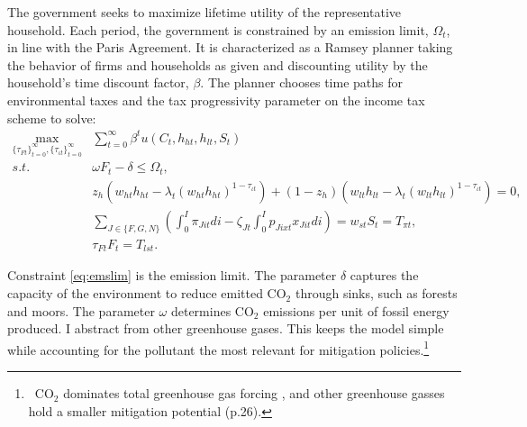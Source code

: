 The government seeks to maximize lifetime utility of the representative household. Each period, the government is constrained by an emission limit, $\Omega_t$, in line with the Paris Agreement.  
It is characterized as a Ramsey planner taking the behavior of firms and households as given and discounting utility by the household's time discount factor, $\beta$.
The planner chooses time paths for environmental taxes and the tax progressivity parameter on the income tax scheme to solve:%
\begin{align}
\underset{\{\tau_{Ft}\}_{t=0}^{\infty},\{\tau_{\iota t}\}_{t=0}^{\infty}}{\max}&\sum_{t=0}^{\infty}\beta^t u(C_{t}, h_{ht}, h_{lt}, S_t)%
\nonumber \\
s.t.\ %
&  \omega F_{t} -\delta \leq \Omega_t, \label{eq:emslim} %
\\ %
&  z_h\left(w_{ht}h_{ht}-\lambda_t \left(w_{ht}h_{ht}\right)^{1-\tau_{\iota t}}\right)+(1-z_h)\left(w_{lt}h_{lt}-\lambda_t\left(w_{lt}h_{lt}\right)^{1-\tau_{\iota t}}\right)=0, \label{eq:incbud}\\
&  \sum_{J\in\{F,G,N\}}\left(\int_{0}^{I}\pi_{Jit}di-\zeta_{Jt}\int_{0}^{I}p_{Jixt}x_{Jit}di\right) = w_{st}S_t= T_{\pi t},\label{eq:profbud}\\ 
&  \tau_{Ft}F_{t}=T_{lst}.\label{eq:envbud}
\end{align}

Constraint \eqref{eq:emslim} is the emission limit. The parameter $\delta$ captures the capacity of the environment to reduce emitted CO$_2$ through sinks, such as forests and moors.  The parameter $\omega$ determines  CO$_2$ emissions per unit of fossil energy produced. I abstract from other greenhouse gases. This keeps the model simple while accounting for the pollutant the most relevant for mitigation policies.\footnote{\ CO$_2$ dominates total greenhouse gas forcing \citep[p.29]{IPCC2022}, and other greenhouse gasses hold a smaller mitigation potential (p.26).}

